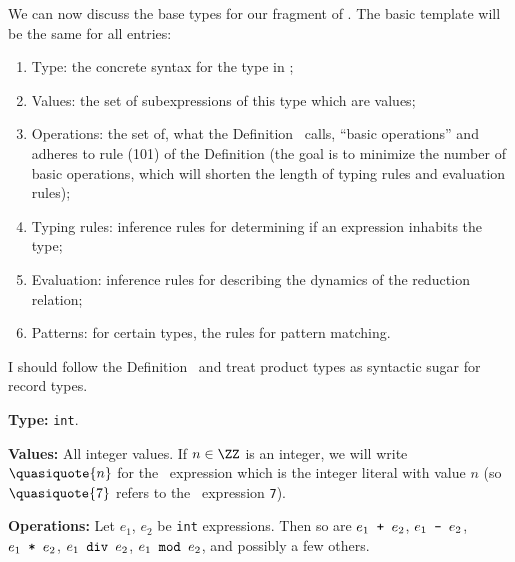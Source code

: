 \begin{node}\label{sml-000D}%
We can now discuss the base types for our fragment of \SML. The basic
template will be the same for all entries:
\begin{enumerate}
\item Type: the concrete syntax for the type in \SML;
\item Values: the set of subexpressions of this type which are values;
\item Operations: the set of, what the Definition~\cite{milner1997definition}
  calls, ``basic operations'' and adheres to rule (101) of the
  Definition (the goal is to minimize the number of basic operations,
  which will shorten the length of typing rules and evaluation rules);
\item Typing rules: inference rules for determining if an expression
  inhabits the type;
\item Evaluation: inference rules for describing the dynamics of the
  reduction relation;
\item Patterns: for certain types, the rules for pattern matching.
\end{enumerate}

\begin{node}[TODO]%
I should follow the Definition~\cite{milner1997definition} and treat
product types as syntactic sugar for record types.
\end{node}

\begin{node}[Integers]\label{sml-000E}%
\textbf{Type:} \texttt{int}.

\textbf{Values:} All integer values. If $n\in\ZZ$ is an integer, we will
write $\quasiquote{n}$ for the \SML\ expression which is the integer
literal with value $n$ (so $\quasiquote{7}$ refers to the
\SML\ expression \texttt{7}).

\textbf{Operations:} Let $e_{1}$, $e_{2}$ be \texttt{int}
expressions. Then so are $e_{1}\mbox{\texttt{ + }}e_{2}$,
$e_{1}\mbox{\texttt{ - }}e_{2}$, $e_{1}\mbox{\texttt{ * }}e_{2}$,
$e_{1}\mbox{\texttt{ div }}e_{2}$, $e_{1}\mbox{\texttt{ mod }}e_{2}$,
and possibly a few others.


\end{node}
\end{node}
